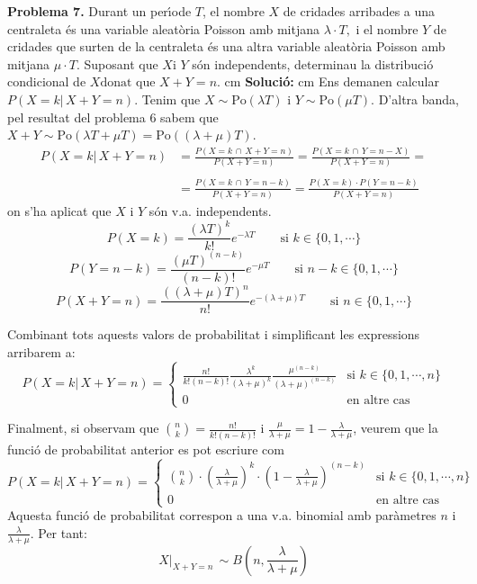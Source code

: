 \documentclass{article}
\begin{document}
\newpage
\noindent
\textbf{Problema 7.}
Durant un per\'{\i}ode $T$, el nombre $X$ de cridades arribades a
una centraleta \'es una variable aleat\`oria Poisson amb mitjana
$\lambda \cdot T,$ i el nombre $Y$ de cridades que surten de la
centraleta \'es una altra variable aleat\`oria Poisson amb mitjana $
\mu \cdot T. $ Suposant que $X \mbox{i } Y$ s\'on independents,
determinau la distribuci\'o condicional de $X \mbox{donat que } X +
Y = n.$ 
 cm
\noindent
\textbf{Soluci\'o:} 
 cm
\noindent
Ens demanen calcular $P(X=k| \, X+Y=n)$. 
Tenim que $X \sim \mathrm{Po}(\lambda T)$ i $Y \sim \mathrm{Po}(\mu T)$.
D'altra banda, pel resultat del problema 6 sabem que $X+Y \sim \mathrm{Po}(\lambda T+\mu T)=\mathrm{Po}((\lambda + \mu) T)$.
\[
\begin{array}{rl}
P(X=k| \, X+Y=n) &= \frac{ P(X=k \, \cap \, X+Y=n) }{P(X+Y=n)}=\frac{ P(X=k \, \cap \, Y=n-X) }{P(X+Y=n)}= \\ \\
&= \frac{ P(X=k \, \cap \, Y=n-k) }{P(X+Y=n)}=\frac{ P(X=k) \cdot P(Y=n-k) }{P(X+Y=n)}
\end{array}
\]
\noindent
on s'ha aplicat que $X$ i $Y$ s\'on v.a. independents.
\[
P(X=k)=\frac{(\lambda T)^k}{k!} e^{-\lambda T} \qquad \text{si } k \in \{ 0, 1, \cdots \} 
\]
\[
P(Y=n-k)=\frac{(\mu T)^{(n-k)}}{(n-k)!} e^{-\mu T} \qquad \text{si } n-k \in \{ 0, 1, \cdots \} 
\]
\[
P(X+Y=n)=\frac{((\lambda + \mu) T)^n}{n!} e^{-(\lambda + \mu) T} \qquad \text{si } n \in \{ 0, 1, \cdots \} 
\]

\noindent
Combinant tots aquests valors de probabilitat i simplificant les expressions arribarem a:
\[
P(X=k| \, X+Y=n)= \begin{cases} 
\frac{n!}{k! (n-k)!} \frac{\lambda^k}{(\lambda+\mu)^k} \frac{\mu^{(n-k)}}{(\lambda+\mu)^{(n-k)}} & 
\text{si } k \in \{0, 1, \cdots, n \} \\
0 & \text{en altre cas} \end{cases}
\]

\noindent
Finalment, si observam que $\binom{n}{k}=\frac{n!}{k! (n-k)!}$ i $\frac{\mu}{\lambda+\mu}=1-\frac{\lambda}{\lambda+\mu}$,
veurem que la funci\'o de probabilitat anterior es pot escriure com
\[
P(X=k| \, X+Y=n)= \begin{cases} 
\binom{n}{k}  \cdot \left( \frac{\lambda}{\lambda+\mu} \right)^k  \cdot \left( 1- \frac{\lambda}{\lambda+\mu} \right)^{(n-k)} & 
\text{si } k \in \{0, 1, \cdots, n \} \\
0 & \text{en altre cas} \end{cases}
\]
\noindent
Aquesta funci\'o de probabilitat correspon a una v.a. binomial amb par\`ametres $n$ i 
$\frac{\lambda}{\lambda+\mu}$. Per tant: 
\[
X |_{X+Y=n} \, \sim B(n, \frac{\lambda}{\lambda+\mu})
\]
 
\end{document}
